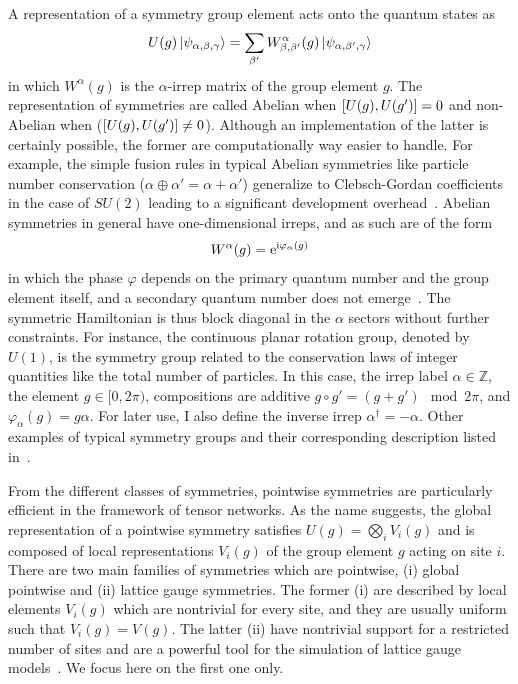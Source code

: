 A representation of a symmetry group element acts onto the quantum states as
\begin{align}
    U(g)\ket{\psi_{\alpha,\beta,\gamma}} = \sum_{\beta'}W^{\alpha}_{\beta,\beta'}(g)\ket{\psi_{\alpha,\beta',\gamma}}
\end{align}
in which $W^\alpha(g)$ is the $\alpha$-irrep matrix of the group element $g$.
The representation of symmetries are called Abelian when $\left[ U(g),U(g') \right]=0$ and non-Abelian when ($\left[ U(g),U(g') \right]\neq0$).
Although an implementation of the latter is certainly possible, the former are computationally way easier to handle.
For example, the simple fusion rules in typical Abelian symmetries like particle number conservation ($\alpha\oplus\alpha'=\alpha+\alpha'$) generalize to Clebsch-Gordan coefficients in the case of $SU(2)$ leading to a significant development overhead~\cite{Schmoll2020}.
Abelian symmetries in general have one-dimensional irreps, and as such are of the form
\begin{align}
    W^\alpha(g) = \mathrm e^{\mathrm i\varphi_\alpha(g)}
\end{align}
in which the phase $\varphi$ depends on the primary quantum number and the group element itself, and a secondary quantum number does not emerge~\cite{Silvi2019}.
The symmetric Hamiltonian is thus block diagonal in the $\alpha$ sectors without further constraints.
For instance, the continuous planar rotation group, denoted by $U(1)$, is the symmetry group related to the conservation laws of integer quantities like the total number of particles.
In this case, the irrep label $\alpha\in\mathds Z$, the element $g\in[0,2\pi)$, compositions are additive $g\circ g' = {(g+g')\mod 2\pi}$, and $\varphi_\alpha(g) = g\alpha$.
For later use, I also define the inverse irrep $\alpha^\dag=-\alpha$.
Other examples of typical symmetry groups and their corresponding description listed in~\cite{Silvi2019}.

From the different classes of symmetries, pointwise symmetries are particularly efficient in the framework of tensor networks.
As the name suggests, the global representation of a pointwise symmetry satisfies $U(g)=\bigotimes_i V_i(g)$ and is composed of local representations $V_i(g)$ of the group element $g$ acting on site $i$.
There are two main families of symmetries which are pointwise, (i) global pointwise and (ii) lattice gauge symmetries.
The former (i) are described by local elements $V_i(g)$ which are nontrivial for every site, and they are usually uniform such that $V_i(g)=V(g)$.
The latter (ii) have nontrivial support for a restricted number of sites and are a powerful tool for the simulation of lattice gauge models~\cite{Banuls2014,Buyens2015}.
We focus here on the first one only.

